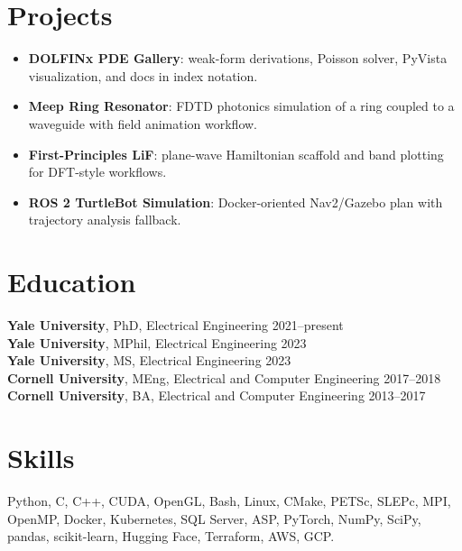 \documentclass[10pt]{article}
\begin{document}
\section{Projects}
\begin{itemize}
\item \textbf{DOLFINx PDE Gallery}: weak-form derivations, Poisson solver,
PyVista visualization, and docs in index notation.
\item \textbf{Meep Ring Resonator}: FDTD photonics simulation of a ring coupled
to a waveguide with field animation workflow.
\item \textbf{First-Principles LiF}: plane-wave Hamiltonian scaffold and band
plotting for DFT-style workflows.
\item \textbf{ROS 2 TurtleBot Simulation}: Docker-oriented Nav2/Gazebo plan
with trajectory analysis fallback.
\end{itemize}

\section{Education}
\textbf{Yale University}, PhD, Electrical Engineering \hfill 2021--present\\
\textbf{Yale University}, MPhil, Electrical Engineering \hfill 2023\\
\textbf{Yale University}, MS, Electrical Engineering \hfill 2023\\
\textbf{Cornell University}, MEng, Electrical and Computer Engineering \hfill 2017--2018\\
\textbf{Cornell University}, BA, Electrical and Computer Engineering \hfill 2013--2017

\section{Skills}
Python, C, C++, CUDA, OpenGL, Bash, Linux, CMake, PETSc, SLEPc, MPI, OpenMP,
Docker, Kubernetes, SQL Server, ASP, PyTorch, NumPy, SciPy, pandas, scikit-learn,
Hugging Face, Terraform, AWS, GCP.
\end{document}

